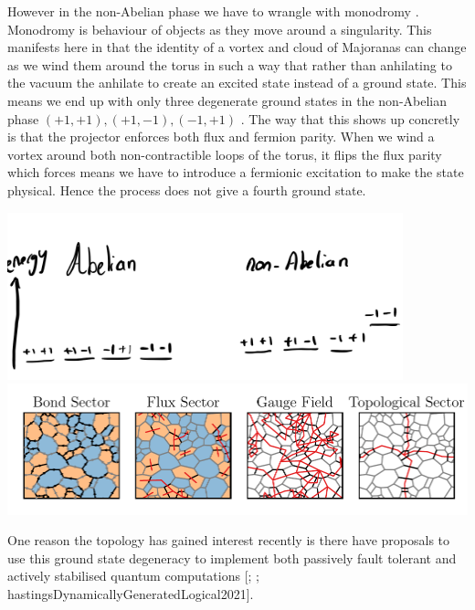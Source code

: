 However in the non-Abelian phase we have to wrangle with monodromy
\autocite{chungExplicitMonodromyMoore2007,oshikawaTopologicalDegeneracyNonAbelian2007}.
Monodromy is behaviour of objects as they move around a singularity.
This manifests here in that the identity of a vortex and cloud of
Majoranas can change as we wind them around the torus in such a way that
rather than anhilating to the vacuum the anhilate to create an excited
state instead of a ground state. This means we end up with only three
degenerate ground states in the non-Abelian phase
\((+1, +1), (+1, -1), (-1, +1)\)
\autocite[yaoAlgebraicSpinLiquid2009a]{chungTopologicalQuantumPhase2010}.
The way that this shows up concretly is that the projector enforces both
flux and fermion parity. When we wind a vortex around both
non-contractible loops of the torus, it flips the flux parity which
forces means we have to introduce a fermionic excitation to make the
state physical. Hence the process does not give a fourth ground state.

\includegraphics[width=0.86\textwidth,height=\textheight]{figure_code/amk_chapter/threefold_degeneracy.png}
\includegraphics[width=1.14\textwidth,height=\textheight]{figure_code/amk_chapter/state_decomposition_animated/state_decomposition_animated.pdf}

One reason the topology has gained interest recently is there have
proposals to use this ground state degeneracy to implement both
passively fault tolerant and actively stabilised quantum computations
{[}\textcite{kitaevFaulttolerantQuantumComputation2003};
\textcite{poulinStabilizerFormalismOperator2005};
hastingsDynamicallyGeneratedLogical2021{]}.
